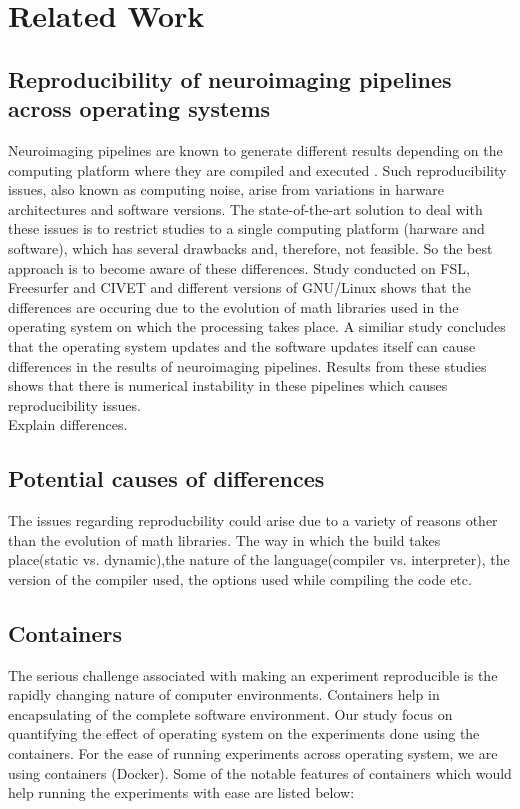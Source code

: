 \chapter{Related Work}

\section{Reproducibility of neuroimaging pipelines across operating systems}
Neuroimaging pipelines are known to generate different results depending on the computing platform where they are compiled and executed \cite{Gla15}. Such reproducibility issues, also known as computing noise, arise from variations in harware architectures and software versions. The state-of-the-art solution to deal with these issues is to restrict studies to a single computing platform (harware and software), which has several drawbacks and, therefore, not feasible. So the best approach is to become aware of these differences.
Study conducted on FSL, Freesurfer and CIVET and different versions of GNU/Linux \cite{Gla15} shows that the differences are occuring due to the evolution of math libraries used in the operating system on which the processing takes place. A similiar study \cite{10.1371/journal.pone.0038234} concludes that the operating system updates and the software updates itself can cause differences in the results of neuroimaging pipelines. Results from these studies shows that there is numerical instability in these pipelines which causes reproducibility issues.\\

Explain differences.\\

\section{Potential causes of differences}
The issues regarding reproducbility could arise due to a variety of reasons other than the evolution of math libraries. The way in which the build takes place(static vs. dynamic),the nature of the language(compiler vs. interpreter), the version of the compiler used, the options used while compiling the code etc.\\ 

\section{Containers}
The serious challenge associated with making an experiment reproducible is the rapidly changing nature of computer environments. Containers help in encapsulating of the complete software environment. Our study focus on quantifying the effect of operating system on the experiments done using the containers. For the ease of running experiments across operating system, we are using containers (Docker). Some of the notable features of containers which would help running the experiments with ease \cite{docker-run} \cite{DBLP:journals/corr/HaleLRW16} \cite{Julian:2016:CRI:2949550.2949562} \cite{10.1109/ISPASS.2015.7095802} are listed below:

